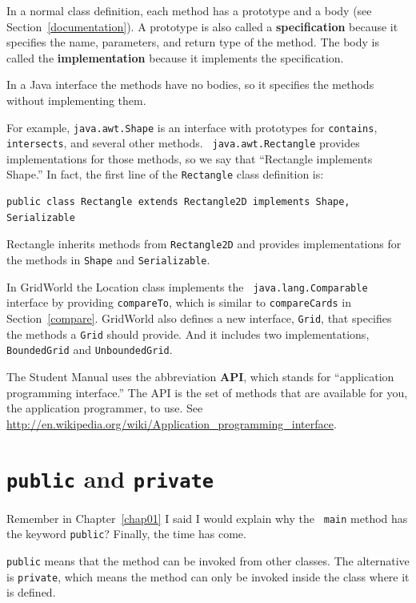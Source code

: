 \documentclass[12pt]{book}
\theoremstyle{exercise}
\begin{document}
In a normal class definition, each method has a prototype and a
body (see Section~\ref{documentation}).  A prototype is also called a
{\bf specification} because it specifies the name, parameters, and
return type of the method. The body is called the {\bf implementation}
because it implements the specification.

In a Java interface the methods have no bodies, so it specifies
the methods without implementing them.

For example, {\tt java.awt.Shape} is an interface with prototypes for
{\tt contains}, {\tt intersects}, and several other methods.  {\tt
  java.awt.Rectangle} provides implementations for those methods, so
we say that ``Rectangle implements Shape.''  In fact, the first line
of the {\tt Rectangle} class definition is:

\begin{lstlisting}
public class Rectangle extends Rectangle2D implements Shape, Serializable
\end{lstlisting}

Rectangle inherits methods from {\tt Rectangle2D} and provides
implementations for the methods in {\tt Shape} and {\tt Serializable}.

In GridWorld the Location class implements the {\tt
  java.lang.Comparable} interface by providing {\tt compareTo}, which
is similar to {\tt compareCards} in Section~\ref{compare}.
%
GridWorld also defines a new interface, {\tt Grid}, that specifies
the methods a {\tt Grid} should provide.  And it includes two
implementations, {\tt BoundedGrid} and {\tt UnboundedGrid}.

The Student Manual uses the abbreviation {\bf API}, which stands for
``application programming interface.''  The API is the set of methods
that are available for you, the application programmer, to use.  See
\url{http://en.wikipedia.org/wiki/Application_programming_interface}.


\section{{\tt public} and {\tt private}}

Remember in Chapter~\ref{chap01} I said I would explain why the {\tt
  main} method has the keyword {\tt public}?  Finally, the time has
come.

{\tt public} means that the method can be invoked from other classes.
The alternative is {\tt private}, which means the method can only
be invoked inside the class where it is defined.
\end{document}
